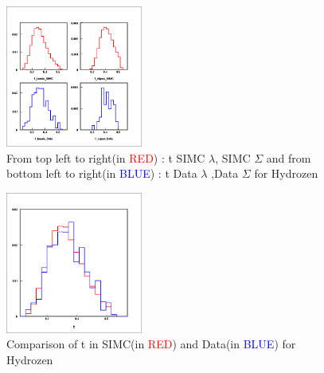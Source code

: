 \documentclass[aps,11pt]{revtex4}
\begin{document}
\begin{figure}[h]
	\centering
		\includegraphics[width=0.40\textwidth]{t_1.png}
	\caption{From top left to right(in \textcolor{red}{RED}) : t SIMC $\lambda$, SIMC $\Sigma$ and from bottom left to right(in \textcolor{blue}{BLUE}) : t Data $\lambda$  ,Data $\Sigma$ for Hydrozen}
	\label{fig:t_1}
\end{figure}
\begin{figure}[h]
	\centering
		\includegraphics[width=0.40\textwidth]{t_2.png}
	\caption{Comparison of t in SIMC(in \textcolor{red}{RED}) and Data(in \textcolor{blue}{BLUE}) for Hydrozen}
	\label{fig:t_2}
\end{figure}

\newpage
\end{document}
